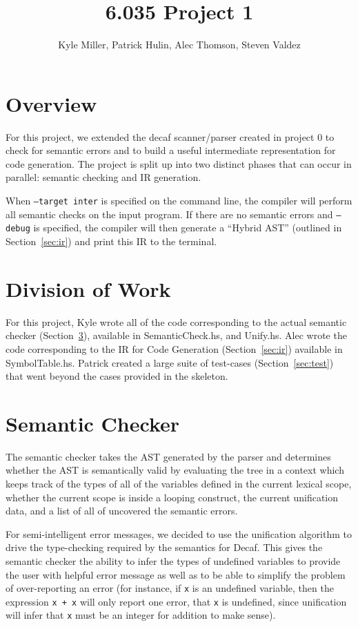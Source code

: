 \documentclass[11pt]{article}
\title{6.035 Project 1}
\author{Kyle Miller, Patrick Hulin, Alec Thomson, Steven Valdez}
\begin{document}
\maketitle

\section{Overview} 

For this project, we extended the decaf scanner/parser created in project 0 to check for semantic errors and to build a useful intermediate representation for code generation. The project is split up into two distinct phases that can occur in parallel: semantic checking and IR generation. 

When \texttt{--target inter} is specified on the command line, the compiler will perform all semantic checks on the input program. If there are no semantic errors and \texttt{--debug} is specified, the compiler will then generate a ``Hybrid AST'' (outlined in Section~\ref{sec:ir}) and print this IR to the terminal. 

\section{Division of Work} 

For this project, Kyle wrote all of the code corresponding to the actual semantic checker (Section~\ref{sec:checker}), available in SemanticCheck.hs, and Unify.hs. Alec wrote the code corresponding to the IR for Code Generation (Section~\ref{sec:ir}) available in SymbolTable.hs. Patrick created a large suite of test-cases (Section~\ref{sec:test}) that went beyond the cases provided in the skeleton. 

\section{Semantic Checker}
\label{sec:checker}

The semantic checker takes the AST generated by the parser and
determines whether the AST is semantically valid by evaluating the
tree in a context which keeps track of the types of all of the
variables defined in the current lexical scope, whether the current
scope is inside a looping construct, the current unification data, and
a list of all of uncovered the semantic errors.

For semi-intelligent error messages, we decided to use the unification
algorithm to drive the type-checking required by the semantics for
Decaf.  This gives the semantic checker the ability to infer the types
of undefined variables to provide the user with helpful error message
as well as to be able to simplify the problem of over-reporting an
error (for instance, if \texttt{x} is an undefined variable, then the
expression \texttt{x + x} will only report one error, that \texttt{x}
is undefined, since unification will infer that \texttt{x} must be an
integer for addition to make sense).
\end{document}
